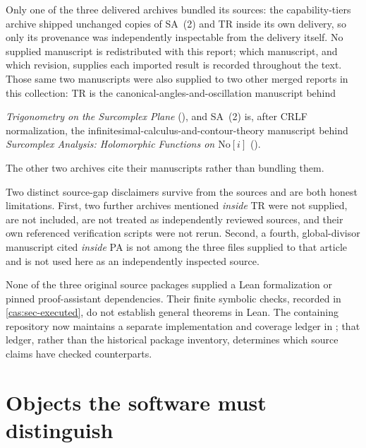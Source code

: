 \documentclass[11pt,letterpaper]{article}
\numberwithin{equation}{section}
\theoremstyle{definition}
\theoremstyle{remark}
\begin{document}
Only one of the three delivered archives bundled its sources: the
capability-tiers archive shipped unchanged copies of SA~(2) and TR inside its
own delivery, so only its provenance was independently inspectable from the
delivery itself. No supplied manuscript is redistributed with this report; which
manuscript, and which revision, supplies each imported result is recorded
throughout the text. Those same two manuscripts were also supplied to two other
merged reports in this collection: TR is the canonical-angles-and-oscillation
manuscript behind
\begin{sloppypar}\noindent
\emph{Trigonometry on the Surcomplex Plane}
(), and SA~(2) is, after CRLF
normalization, the infinitesimal-calculus-and-contour-theory manuscript behind
\emph{Surcomplex Analysis: Holomorphic Functions on $\mathrm{No}[i]$}
().
\end{sloppypar} The other two archives cite their manuscripts rather
than bundling them.

Two distinct source-gap disclaimers survive from the sources and are both
honest limitations. First, two further archives mentioned \emph{inside} TR were
not supplied, are not included, are not treated as independently reviewed
sources, and their own referenced verification scripts were not rerun. Second, a
fourth, global-divisor manuscript cited \emph{inside} PA is not among the three
files supplied to that article and is not used here as an independently
inspected source.

None of the three original source packages supplied a Lean formalization or
pinned proof-assistant dependencies. Their finite symbolic checks, recorded in
\cref{cas:sec-executed}, do not establish general theorems in Lean. The containing
repository now maintains a separate implementation and coverage ledger in
; that ledger, rather than the historical package
inventory, determines which source claims have checked counterparts.

\section{Objects the software must distinguish}
\label{cas:sec-objects}
\end{document}
